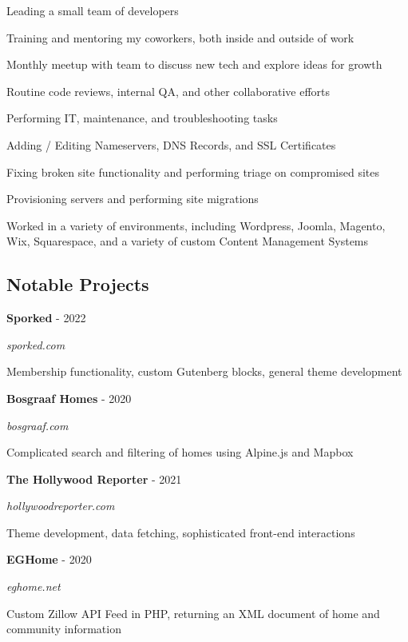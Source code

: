 \documentclass{article}
\newenvironment{narrow_list}{
	\begin{itemize}
		\setlength{\itemsep}{0pt}
		\setlength{\parskip}{-1pt}
		\setlength{\parsep}{0pt}
	}{\end{itemize}
}
\begin{document}
	Leading a small team of developers

	\begin{narrow_list}
		\item Training and mentoring my coworkers, both inside and outside of work
		\item Monthly meetup with team to discuss new tech and explore ideas for growth
		\item Routine code reviews, internal QA, and other collaborative efforts
	\end{narrow_list}

	Performing IT, maintenance, and troubleshooting tasks

	\begin{narrow_list}
		\item Adding / Editing Nameservers, DNS Records, and SSL Certificates
		\item Fixing broken site functionality and performing triage on compromised sites
		\item Provisioning servers and performing site migrations
		\item Worked in a variety of environments, including Wordpress, Joomla, Magento, Wix, Squarespace, and a variety of custom Content Management Systems
	\end{narrow_list}

	

	\vspace{3mm}

	\subsection*{Notable Projects}

	\vspace{0mm}

	\setlength{\columnsep}{1cm}

	\begin{multicols}{2}
		\textbf{Sporked} - 2022

		\textit{sporked.com}

		Membership functionality, custom Gutenberg blocks, general theme development

	\vspace{2mm}

		\textbf{Bosgraaf Homes} - 2020

		\textit{bosgraaf.com}
			
		Complicated search and filtering of homes using Alpine.js and Mapbox

	\columnbreak

		\textbf{The Hollywood Reporter} - 2021

		\textit{hollywoodreporter.com}

		Theme development, data fetching, sophisticated front-end interactions

	\vspace{2mm}

		\textbf{EGHome} - 2020

		\textit{eghome.net}

		Custom Zillow API Feed in PHP, returning an XML document of home and community information

	\end{multicols}
\end{document}
